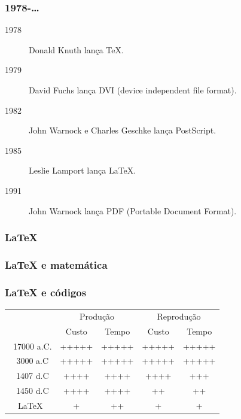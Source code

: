 \documentclass[]{beamer}
\begin{document}
\begin{frame}
    \frametitle{1978-\ldots}
    \begin{description}
        \item[1978] Donald Knuth lan\c{c}a TeX.
        \item[1979] David Fuchs lan\c{c}a DVI (device independent file format).
        \item[1982] John Warnock e Charles Geschke lan\c{c}a PostScript.
        \item[1985] Leslie Lamport lan\c{c}a LaTeX.
        \item[1991] John Warnock lan\c{c}a PDF (Portable Document Format).
    \end{description}
\end{frame}

\begin{frame}[fragile]
    \frametitle{LaTeX}
    
\end{frame}

\begin{frame}[fragile]
    \frametitle{LaTeX e matem\'{a}tica}
    
\end{frame}

\begin{frame}[fragile]
    \frametitle{LaTeX e c\'{o}digos}
    
\end{frame}

\begin{frame}[t]
    \begin{center}
        \begin{tabular}{|c|c|c|c|c|}
            \hline
            & \multicolumn{2}{|c|}{Produ\c{c}\~{a}o} & \multicolumn{2}{|c|}{Reprodu\c{c}\~{a}o} \\ \cline{2-5}
            & Custo & Tempo & Custo & Tempo \\ \hline
            ~17000 a.C. & +++++ & +++++ & +++++ & +++++  \\ \hline
            ~3000 a.C & +++++ & +++++ & +++++ & +++++ \\ \hline
            ~1407 d.C & ++++ & ++++ & ++++ & +++ \\ \hline
            ~1450 d.C & ++++ & ++++ & ++ & ++ \\ \hline
            LaTeX  & + & ++ & + & + \\ \hline
        \end{tabular}
    \end{center}
\end{frame}
\end{document}

